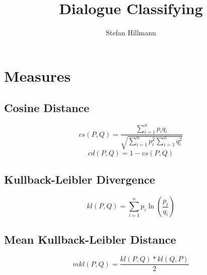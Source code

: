 \documentclass[10pt,a4paper]{article}
\author{Stefan Hillmann}
\title{Dialogue Classifying}
\begin{document}
\maketitle

\section{Measures}
\subsection{Cosine Distance}
\begin{equation}
  cs(P,Q)=\frac{ \sum\limits_{i=1}^n p_i q_i }{ \sqrt{ \sum\limits_{i=1}^n p_i^2 \sum\limits_{i=1}^n q_i^2 } }
\end{equation}
\begin{equation}
  cd(P,Q) = 1-cs(P,Q)
\end{equation}

\subsection{Kullback-Leibler Divergence}
\begin{equation}
  kl(P, Q) = \sum\limits_{i=1}^n p_i \ln\left(\frac{p_i}{q_i}\right)
\end{equation}

\subsection{Mean Kullback-Leibler Distance}
\begin{equation}
  mkl(P, Q) = \frac{kl(P,Q)*kl(Q,P)}{2}
\end{equation}
\end{document}
